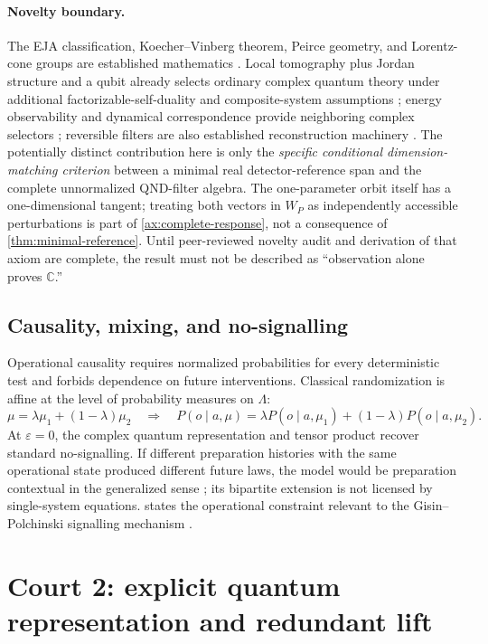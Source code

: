 \documentclass[10pt]{article}
\theoremstyle{definition}
\theoremstyle{remark}
\newcommand{\C}{\mathbb C}
\begin{document}
\paragraph{Novelty boundary.}
The EJA classification, Koecher--Vinberg theorem, Peirce geometry, and Lorentz-cone groups are established mathematics \citep{Jordan1934,FarautKoranyi1994}. Local tomography plus Jordan structure and a qubit already selects ordinary complex quantum theory under additional factorizable-self-duality and composite-system assumptions \citep{BarnumWilce2014}; energy observability and dynamical correspondence provide neighboring complex selectors \citep{BarnumMullerUdudec2014,Niestegge2015}; reversible filters are also established reconstruction machinery \citep{Wilce2019}. The potentially distinct contribution here is only the \emph{specific conditional dimension-matching criterion} between a minimal real detector-reference span and the complete unnormalized QND-filter algebra. The one-parameter orbit itself has a one-dimensional tangent; treating both vectors in \(W_P\) as independently accessible perturbations is part of \cref{ax:complete-response}, not a consequence of \cref{thm:minimal-reference}. Until peer-reviewed novelty audit and derivation of that axiom are complete, the result must not be described as ``observation alone proves \(\C\).''

\subsection{Causality, mixing, and no-signalling}

Operational causality requires normalized probabilities for every deterministic test and forbids dependence on future interventions. Classical randomization is affine at the level of probability measures on \(\Lambda\):
\[
\mu=\lambda\mu_1+(1-\lambda)\mu_2
\quad\Longrightarrow\quad
P(o\mid a,\mu)
=\lambda P(o\mid a,\mu_1)+(1-\lambda)P(o\mid a,\mu_2).
\]
At \(\varepsilon=0\), the complex quantum representation and tensor product recover standard no-signalling. If different preparation histories with the same operational state produced different future laws, the model would be preparation contextual in the generalized sense \citep{Spekkens2005}; its bipartite extension is not licensed by single-system equations.  states the operational constraint relevant to the Gisin--Polchinski signalling mechanism \citep{Gisin1990,Polchinski1991}.

\section{Court 2: explicit quantum representation and redundant lift}
\end{document}
